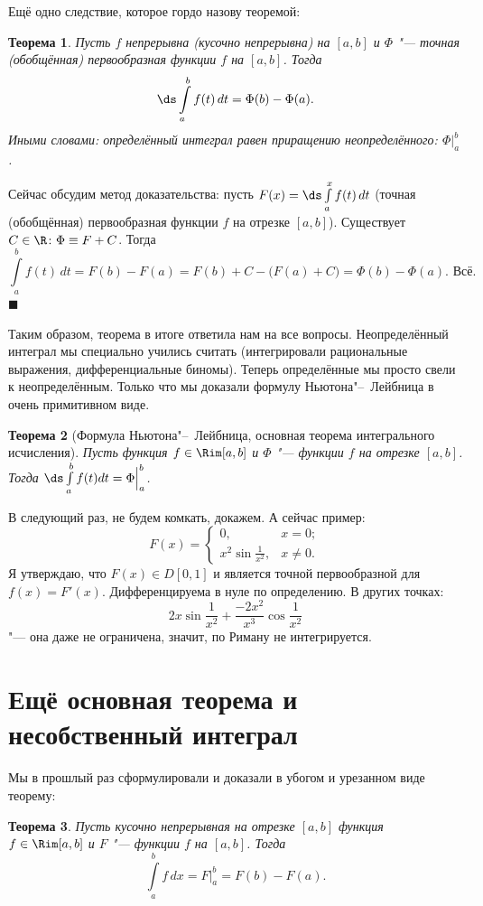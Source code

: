 \documentclass[a4paper,10pt,twoside]{article}
\newtheorem{The}{Теорема}[section]
\newenvironment{Proof}
       {\par\noindent{\textbf{Доказательство.}}}
       {\hfill$\scriptstyle\blacksquare$}
\let\AVsection\section{}
\renewcommand\section{\newpage\scol\AVsection}
\newcommand{\scol}{  \renewcommand{\headrulewidth}{0.5pt}\fancyhead[RE,LO]{\thesection{} \leftmark} \fancyhead[LE,RO]{\thepage}}
\begin{document}
    Ещё одно следствие, которое гордо назову теоремой:
    
    \begin{The}
    	Пусть $f$ непрерывна (кусочно непрерывна) на $[a,b]$ и $\Phi$ "--- точная (обобщённая) первообразная
    	функции $f$ на $[a,b]$. Тогда \[\ds\int\limits_a^bf(t)\,dt=\Phi(b)-\Phi(a).\]
    	Иными словами: определённый интеграл равен приращению неопределённого: $\Phi\big|_a^b$.
    \end{The}
    
    \begin{Proof}
    	Сейчас обсудим метод доказательства: пусть $F(x)=\ds\int\limits_a^xf(t)\,dt$
    	(точная (обобщённая) первообразная функции $f$ на отрезке $[a,b]$). Существует $C\in\R\colon \Phi\equiv F+C$.
    	Тогда $$\int\limits_a^bf(t)\,dt=F(b)-F(a)=F(b)+C-\big(F(a)+C\big)=\Phi(b)-\Phi(a).\text{ Всё.}$$
    \end{Proof}
    
    Таким образом, теорема в итоге ответила нам на все вопросы. Неопределённый интеграл мы специально учились считать (интегрировали рациональные
    выражения, дифференциальные биномы\ldotst{}). Теперь определённые мы просто свели к неопределённым. Только что мы доказали формулу Ньютона"--~Лейбница
    в очень примитивном виде.
    
    \begin{The}[Формула Ньютона"--~Лейбница, основная теорема интегрального исчисления]
    Пусть функция $f\in\Rim[a,b]$ и $\Phi$ "--- \op{} функции $f$ на отрезке $[a,b]$.
    Тогда $\ds\int\limits_a^bf(t)dt=\Phi\Big|_a^b$.
    \end{The}
    
    В следующий раз, не будем комкать, докажем. А сейчас пример:
    $$F(x)=\begin{cases}0,&x=0;\\ x^2\sin \frac{1}{x^2},&x\neq 0.\end{cases}$$
    Я утверждаю, что $F(x)\in D[0,1]$ и является точной первообразной для $f(x)=F'(x)$.
    Дифференцируема в нуле по определению. В других точках:
    $$2x\sin\frac1{x^2}+\frac{-2x^2}{x^3}\cos\frac{1}{x^2}$$
    "--- она даже не ограничена, значит, по Риману не интегрируется.
    
    \section{Ещё основная теорема и несобственный интеграл}
    Мы в прошлый раз сформулировали и доказали в убогом и урезанном виде теорему:
    \begin{The}\label{NL}
    	Пусть кусочно непрерывная на отрезке $[a,b]$ функция $f\in\Rim[a,b]$ и $F$ "--- \op{} функции $f$ на $[a,b]$. Тогда
    	\[\int\limits_a^bf\,dx=F\bigg|_a^b=F(b)-F(a).\]
    \end{The}
    
\end{document}
